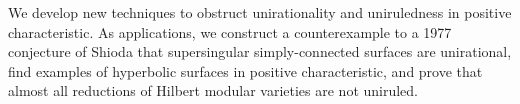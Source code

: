 
We develop new techniques to obstruct unirationality and uniruledness in positive characteristic. As applications, we construct a counterexample to a 1977 conjecture of Shioda that supersingular simply-connected surfaces are unirational, find examples of hyperbolic surfaces in positive characteristic, and prove that almost all reductions of Hilbert modular varieties are not uniruled. 